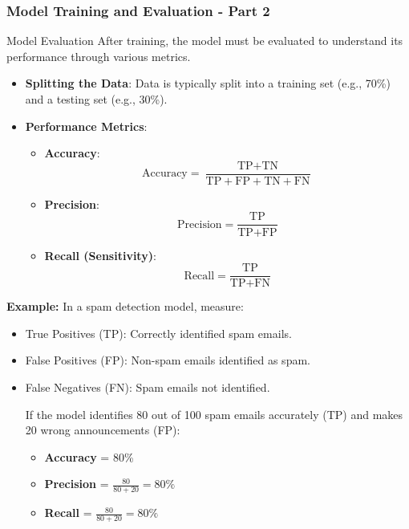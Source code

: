 \documentclass[aspectratio=169]{beamer}
\begin{document}
\begin{frame}[fragile]
    \frametitle{Model Training and Evaluation - Part 2}
    
    \begin{block}{Model Evaluation}
        After training, the model must be evaluated to understand its performance through various metrics.
    \end{block}
    
    \begin{itemize}
        \item \textbf{Splitting the Data}: Data is typically split into a training set (e.g., 70\%) and a testing set (e.g., 30\%).
        \item \textbf{Performance Metrics}:
            \begin{itemize}
                \item \textbf{Accuracy}:
                    \[
                    \text{Accuracy} = \frac{\text{TP} + \text{TN}}{\text{TP} + \text{FP} + \text{TN} + \text{FN}}
                    \]
                \item \textbf{Precision}:
                    \[
                    \text{Precision} = \frac{\text{TP}}{\text{TP} + \text{FP}}
                    \]
                \item \textbf{Recall (Sensitivity)}:
                    \[
                    \text{Recall} = \frac{\text{TP}}{\text{TP} + \text{FN}}
                    \]
            \end{itemize}
    \end{itemize}
    
    \textbf{Example:} In a spam detection model, measure:
    \begin{itemize}
        \item True Positives (TP): Correctly identified spam emails.
        \item False Positives (FP): Non-spam emails identified as spam.
        \item False Negatives (FN): Spam emails not identified.
        
        If the model identifies 80 out of 100 spam emails accurately (TP) and makes 20 wrong announcements (FP):
        \begin{itemize}
            \item \textbf{Accuracy} = 80\%
            \item \textbf{Precision} = \( \frac{80}{80 + 20} = 80\% \)
            \item \textbf{Recall} = \( \frac{80}{80 + 20} = 80\% \)
        \end{itemize}
    \end{itemize}
\end{frame}
\end{document}

